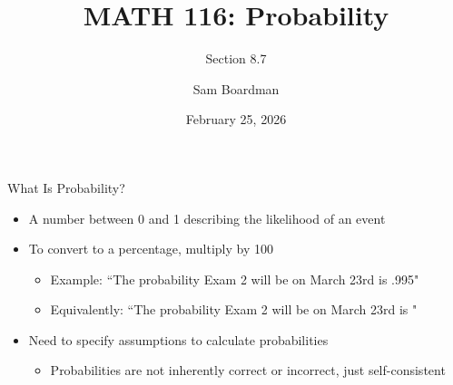 \documentclass{beamer}
\title[MATH 116: Probability] 
{MATH 116: Probability}
\subtitle{Section 8.7}
\author[S. Boardman]
{Sam Boardman}
\date[2/25/26]
{February 25, 2026}
\begin{document}
\frame{\titlepage}

\begin{frame}{What Is Probability?}
    \begin{itemize}
    
        \item A number between 0 and 1 describing the likelihood of an event

        \vfill
        
        \item To convert to a percentage, multiply by 100
        \begin{itemize}
            \item Example: ``The probability Exam 2 will be on March 23rd is .995"
            \item Equivalently: ``The probability Exam 2 will be on March 23rd is "
        \end{itemize}

        \vfill 

        \item<3> Need to specify assumptions to calculate probabilities
        \begin{itemize}
            \item Probabilities are not inherently correct or incorrect, just self-consistent 
        \end{itemize}
        
    \end{itemize}
\end{frame}
\end{document}
